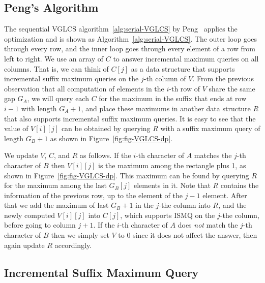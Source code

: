 
\subsection{Peng's Algorithm}

The sequential VGLCS algorithm~\ref{alg:serial-VGLCS} by
Peng~\cite{Peng2011TheLC} applies the optimization and is shown as
Algorithm~\ref{alg:serial-VGLCS}.  The outer loop goes through every
row, and the inner loop goes through every element of a row from left
to right.  We use an array of $C$ to answer incremental maximum
queries on all columns.  That is, we can think of $C[j]$ as a data
structure that supports incremental suffix maximum queries on the
$j$-th column of $V$.  From the previous observation that all
computation of elements in the $i$-th row of $V$ share the same gap
$G_A$, we will query each $C$ for the maximum in the suffix that ends
at row $i-1$ with length $G_A + 1$, and place these maximums in
another data structure $R$ that also supports incremental suffix
maximum queries.  It is easy to see that the value of $V[i][j]$ can be
obtained by querying $R$ with a suffix maximum query of length $G_B +
1$ as shown in Figure~\ref{fig:fig-VGLCS-dp}.

We update $V$, $C$, and $R$ as follows.  If the $i$-th character of
$A$ matches the $j$-th character of $B$ then $V[i][j]$ is the maximum
among the rectangle plus 1, as shown in Figure~\ref{fig:fig-VGLCS-dp}.
This maximum can be found by querying $R$ for the maximum among the
last $G_B[j]$ elements in it.  Note that $R$ contains the information
of the previous row, up to the element of the $j-1$ element.  After
that we add the maximum of last $G_B + 1$ in the $j$-the column into
$R$, and the newly computed $V[i][j]$ into $C[j]$, which supports ISMQ
on the $j$-the column, before going to column $j + 1$.  If the $i$-th
character of $A$ does {\em not} match the $j$-th character of $B$ then
we simply set $V$ to 0 since it does not affect the answer, then again
update $R$ accordingly.
 


\subsection{Incremental Suffix Maximum Query}

